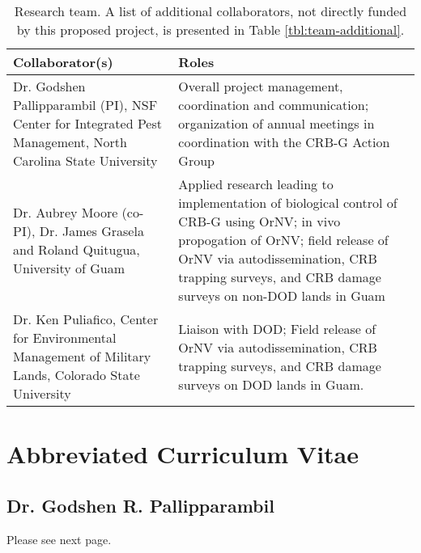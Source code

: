 \documentclass[11pt,english,letterpaper]{scrartcl}
\begin{document}
\begin{table}[h]
	\centering
	\caption{Research team. A list of additional collaborators, not directly funded by this proposed project, is presented in Table \ref{tbl:team-additional}.}	
	
	\begin{tabular}{p{2.2in}p{4in}}
		\toprule
		\textbf{Collaborator(s)} & \textbf{Roles} \\ \midrule
		Dr. Godshen Pallipparambil (PI), NSF Center for Integrated Pest Management, North Carolina State University	& 	Overall project management, coordination and communication; organization of annual meetings in coordination with the CRB-G Action Group \\ \midrule
		
		Dr. Aubrey Moore (co-PI), Dr. James Grasela and Roland Quitugua, University of Guam & Applied research leading to implementation of biological control of CRB-G using OrNV; {in vivo} propogation of OrNV; field release of OrNV via autodissemination, CRB trapping surveys, and CRB damage surveys on non-DOD lands in Guam \\ \midrule
		
		Dr. Ken Puliafico, Center for Environmental Management of Military Lands, Colorado State University & Liaison with DOD; Field release of OrNV via autodissemination, CRB trapping surveys, and CRB damage surveys on DOD lands in Guam. \\ \bottomrule
		
	\end{tabular}
	\label{tbl:team}
	
\end{table}



\clearpage

\appendix

\newpage

\section{Abbreviated Curriculum Vitae}


\subsection{Dr. Godshen R. Pallipparambil}
Please see next page.

\end{document}
